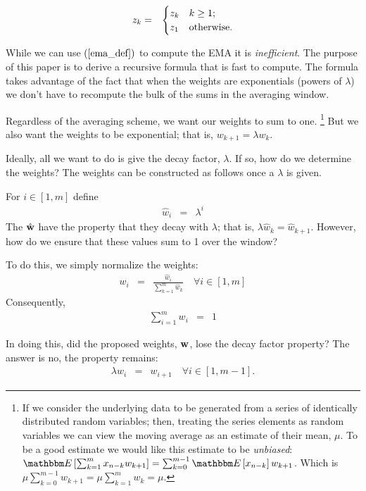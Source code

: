 \documentclass{article}
\newcommand{\E}[1] {\mathbbm E\left[#1\right]}
\begin{document}
\begin{eqnarray}
    z_{k} &=&  \begin{cases}
     z_{k} & k \ge 1; \cr
     z_1 & \text{otherwise}. \cr
 \end{cases} \label{o:var_extend}
\end{eqnarray}

While we can use $(\ref{ema_def})$ to compute the EMA it is {\em inefficient\/}. 
The purpose of this
paper is to derive a recursive formula that is fast to compute.
The formula takes advantage of the fact that when the weights are exponentials
(powers of $\lambda$) we don't have to recompute the bulk of the sums in the 
averaging window.

Regardless of the averaging scheme, we want our weights to sum to one.%
\footnote{If we consider the underlying data to be generated from a series of identically distributed random
variables; then, treating the series elements as random variables we can view 
the moving average as an estimate of their mean, $\mu$. 
To be a good estimate we would like this estimate to be {\em unbiased\/}:
$\E{\sum_{k=1}^m x_{n-k} w_{k+1}} = \sum_{k=0}^{m-1} \E{x_{n-k}}w_{k+1}$.
Which is $\mu \sum_{k=0}^{m-1} w_{k+1} = \mu \sum_{k=1}^{m} w_k = \mu$.}
But we also want the weights to be exponential; that is, $w_{k+1} = \lambda w_{k}$.

Ideally, all we want to do is give the decay factor, $\lambda$. If so, 
how do we determine the weights?
The weights can be constructed as follows once a $\lambda$ is given.

For $i \in [1, m]$ define
\begin{eqnarray}
    {\hat w}_i &=& \lambda^i 
\end{eqnarray}
The ${\hat {\bf w}}$ have the property that they decay with $\lambda$;
that is, $\lambda {\hat w}_{k} = {\hat w}_{k+1}$. However, how do we ensure that
these values sum to 1 over the window? 

To do this, we simply normalize the weights:
\begin{eqnarray}
    w_i &=&  \frac{{\hat w}_i}{\sum_{k=1}^m {\hat w}_k} \quad \forall i \in [1, m] 
\end{eqnarray}
Consequently,
\begin{eqnarray}
    \sum_{i=1}^m w_i &=& 1 \label{o:weights_normalized}
\end{eqnarray}

In doing this, did the proposed weights, ${\bf w}$, lose the decay factor
property? The answer is no, the property remains: 
\begin{eqnarray}
    \lambda w_{i} &=& w_{i+1} \quad \forall i \in [1, m-1].  \label{o:weights_power}
\end{eqnarray}
\end{document}
